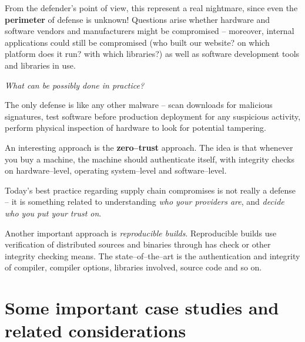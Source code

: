\documentclass[10pt]{extbook}
\begin{document}
From the defender's point of view, this represent a real nightmare, since even
the \textbf{perimeter} of defense is unknown! Questions arise whether hardware
and software vendors and manufacturers might be compromised -- moreover,
internal applications could still be compromised (who built our
website? on which platform does it run? with which libraries?) as well as
software development tools and libraries in use.

\bigskip

\begin{center}
\emph{What can be possibly done in practice?}
\end{center}

\bigskip

The only defense is like any other malware -- scan downloads for malicious
signatures, test software before production deployment for any suspicious
activity, perform physical inspection of hardware to look for potential
tampering.

An interesting approach is the \textbf{zero--trust} approach. The idea is that
whenever you buy a machine, the machine should authenticate itself, with
integrity checks on hardware--level, operating system--level and
software--level.

Today's best practice regarding supply chain compromises is not really a
defense -- it is something related to understanding \emph{who your providers
are}, and \emph{decide who you put your trust on}.

Another important approach is \emph{reproducible builds}. Reproducible builds
use verification of distributed sources and binaries through has check or other
integrity checking means. The state--of--the--art is the authentication and
integrity of compiler, compiler options, libraries involved, source code and so
on.

\chapter{Some important case studies and related considerations}
\end{document}
